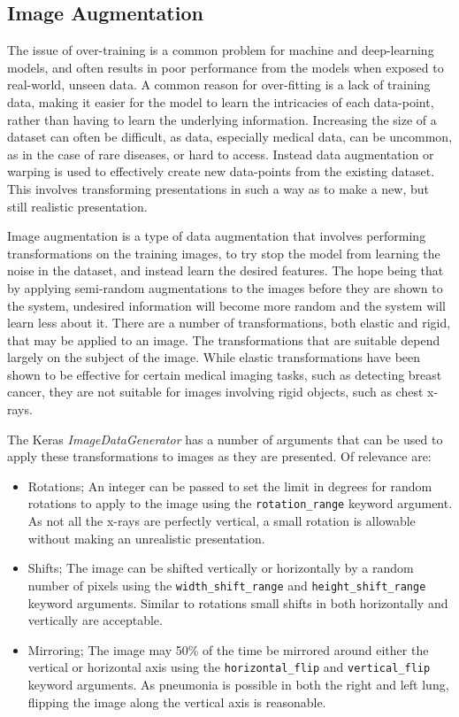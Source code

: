 \documentclass[12pt,a4paper,titlepage,twoside]{report}
\begin{document}
	\subsection{Image Augmentation}
	The issue of over-training  is a common problem for machine and deep-learning models, and often results in poor performance from the models when exposed to real-world, unseen data. A common reason for over-fitting is a lack of training data, making it easier for the model to learn the intricacies of each data-point, rather than having to learn the underlying information. Increasing the size of a dataset can often be difficult, as data, especially medical data, can be uncommon, as in the case of rare diseases, or hard to access. Instead data augmentation or warping is used to effectively create new data-points from the existing dataset\cite{image-aug-over-fitting}. This involves transforming presentations in such a way as to make a new, but still realistic presentation. \par
	Image augmentation is a type of data augmentation that involves performing transformations on the training images, to try stop the model from learning the noise in the dataset, and instead learn the desired features\cite{image-augmentation}. The hope being that by applying semi-random augmentations to the images before they are shown to the system, undesired information will become more random and the system will learn less about it. There are a number of transformations, both elastic and rigid, that may be applied to an image. The transformations that are suitable depend largely on the subject of the image. While elastic transformations have been shown to be effective for certain medical imaging tasks, such as detecting breast cancer\cite{breast-cancer-detection}, they are not suitable for images involving rigid objects, such as chest x-rays\cite{chest-xray-augmentation}. \par
	The Keras \textit{ImageDataGenerator} has a number of arguments that can be used to apply these transformations to images as they are presented. Of relevance are:
	\begin{itemize}
		\item Rotations; An integer can be passed to set the limit in degrees for random rotations to apply to the image using the \verb!rotation_range! keyword argument. As not all the x-rays are perfectly vertical, a small rotation is allowable without making an unrealistic presentation.
		\item Shifts; The image can be shifted vertically or horizontally by a random number of pixels using the \verb!width_shift_range! and \verb!height_shift_range! keyword arguments. Similar to rotations small shifts in both horizontally and vertically are acceptable.
		\item Mirroring; The image may 50\% of the time be mirrored around either the vertical or horizontal axis using the \verb!horizontal_flip! and \verb!vertical_flip! keyword arguments. As pneumonia is possible in both the right and left lung, flipping the image along the vertical axis is reasonable.
	\end{itemize}
\end{document}
